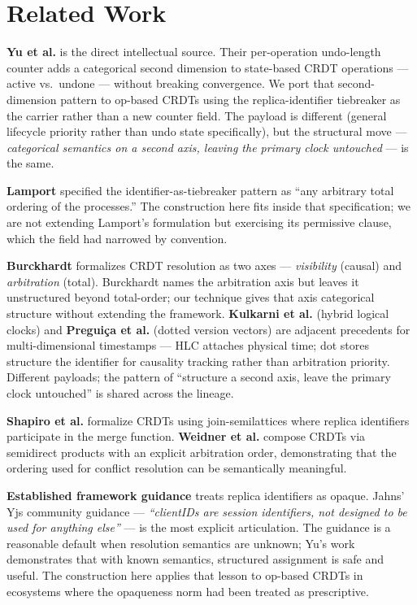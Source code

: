 \section{Related Work}

\textbf{Yu et al.}\cite{yu2019opodis} is the direct intellectual source. Their per-operation undo-length counter adds a categorical second dimension to state-based CRDT operations --- active vs.\ undone --- without breaking convergence. We port that second-dimension pattern to op-based CRDTs using the replica-identifier tiebreaker as the carrier rather than a new counter field. The payload is different (general lifecycle priority rather than undo state specifically), but the structural move --- \emph{categorical semantics on a second axis, leaving the primary clock untouched} --- is the same.

\textbf{Lamport}\cite{lamport1978} specified the identifier-as-tiebreaker pattern as ``any arbitrary total ordering of the processes.'' The construction here fits inside that specification; we are not extending Lamport's formulation but exercising its permissive clause, which the field had narrowed by convention.

\textbf{Burckhardt}\cite{burckhardt2014} formalizes CRDT resolution as two axes --- \emph{visibility} (causal) and \emph{arbitration} (total). Burckhardt names the arbitration axis but leaves it unstructured beyond total-order; our technique gives that axis categorical structure without extending the framework. \textbf{Kulkarni et al.}\cite{kulkarni2014hlc} (hybrid logical clocks) and \textbf{Preguiça et al.}\cite{preguica2010dotted} (dotted version vectors) are adjacent precedents for multi-dimensional timestamps --- HLC attaches physical time; dot stores structure the identifier for causality tracking rather than arbitration priority. Different payloads; the pattern of ``structure a second axis, leave the primary clock untouched'' is shared across the lineage.

\textbf{Shapiro et al.}\cite{shapiro2011crdt} formalize CRDTs using join-semilattices where replica identifiers participate in the merge function. \textbf{Weidner et al.}\cite{weidner2020semidirect} compose CRDTs via semidirect products with an explicit arbitration order, demonstrating that the ordering used for conflict resolution can be semantically meaningful.

\textbf{Established framework guidance} treats replica identifiers as opaque. Jahns' Yjs community guidance\cite{jahns2020clientid} --- \emph{``clientIDs are session identifiers, not designed to be used for anything else''} --- is the most explicit articulation. The guidance is a reasonable default when resolution semantics are unknown; Yu's work demonstrates that with known semantics, structured assignment is safe and useful. The construction here applies that lesson to op-based CRDTs in ecosystems where the opaqueness norm had been treated as prescriptive.

